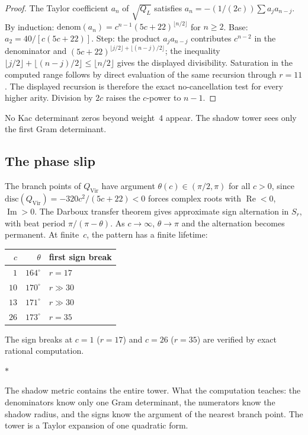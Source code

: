 \documentclass[11pt]{article}
\newcommand{\sep}{\bigskip\begin{center}$*$\end{center}\medskip}
\begin{document}
\begin{proof}
The Taylor coefficient $a_n$ of $\sqrt{Q_L}$ satisfies
$a_n = -(1/(2c))\sum a_j a_{n-j}$.  By induction:
$\mathrm{denom}(a_n) = c^{n-1}(5c{+}22)^{\lfloor n/2\rfloor}$
for $n \geq 2$.  Base: $a_2 = 40/[c(5c{+}22)]$.  Step: the
product $a_j a_{n-j}$ contributes $c^{n-2}$ in the denominator
and $(5c{+}22)^{\lfloor j/2\rfloor + \lfloor(n-j)/2\rfloor}$;
the inequality $\lfloor j/2\rfloor + \lfloor(n{-}j)/2\rfloor
\leq \lfloor n/2\rfloor$ gives the displayed divisibility.
Saturation in the computed range follows by direct evaluation of the
same recursion through $r=11$.  The displayed recursion is therefore
the exact no-cancellation test for every higher arity.
Division by $2c$ raises the $c$-power to $n - 1$.
\end{proof}

No Kac determinant zeros beyond weight~$4$ appear.  The shadow
tower sees only the first Gram determinant.

\subsection*{The phase slip}

The branch points of $Q_{\mathrm{Vir}}$ have argument
$\theta(c) \in (\pi/2, \pi)$ for all $c > 0$, since
$\mathrm{disc}(Q_{\mathrm{Vir}}) = -320c^2/(5c{+}22) < 0$
forces complex roots with $\operatorname{Re} < 0$,
$\operatorname{Im} > 0$.  The Darboux transfer theorem gives
approximate sign alternation in $S_r$, with beat period
$\pi/(\pi - \theta)$.  As $c \to \infty$,
$\theta \to \pi$ and the alternation becomes permanent.
At finite~$c$, the pattern has a finite lifetime:
\begin{center}
\small
\renewcommand{\arraystretch}{1.15}
\begin{tabular}{rrl}
$c$ & $\theta$ & first sign break \\ \hline
$1$ & $164^\circ$ & $r = 17$ \\
$10$ & $170^\circ$ & $r \gg 30$ \\
$13$ & $171^\circ$ & $r \gg 30$ \\
$26$ & $173^\circ$ & $r = 35$
\end{tabular}
\end{center}
The sign breaks at $c = 1$ ($r = 17$) and $c = 26$ ($r = 35$)
are verified by exact rational computation.

\sep

The shadow metric contains the entire tower.  What the computation
teaches: the denominators know only one Gram determinant, the
numerators know the shadow radius, and the signs know the
argument of the nearest branch point.  The tower is a Taylor
expansion of one quadratic form.
\end{document}
